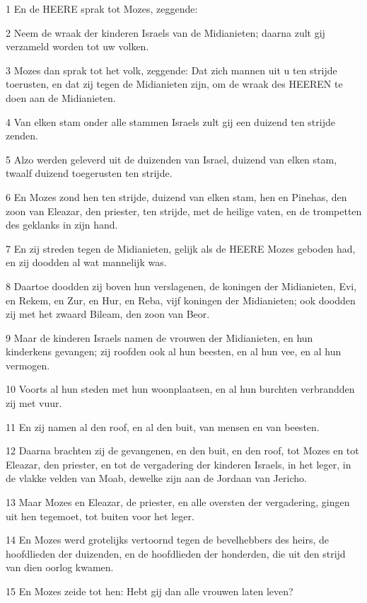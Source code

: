 \par 1 En de HEERE sprak tot Mozes, zeggende:
\par 2 Neem de wraak der kinderen Israels van de Midianieten; daarna zult gij verzameld worden tot uw volken.
\par 3 Mozes dan sprak tot het volk, zeggende: Dat zich mannen uit u ten strijde toerusten, en dat zij tegen de Midianieten zijn, om de wraak des HEEREN te doen aan de Midianieten.
\par 4 Van elken stam onder alle stammen Israels zult gij een duizend ten strijde zenden.
\par 5 Alzo werden geleverd uit de duizenden van Israel, duizend van elken stam, twaalf duizend toegerusten ten strijde.
\par 6 En Mozes zond hen ten strijde, duizend van elken stam, hen en Pinehas, den zoon van Eleazar, den priester, ten strijde, met de heilige vaten, en de trompetten des geklanks in zijn hand.
\par 7 En zij streden tegen de Midianieten, gelijk als de HEERE Mozes geboden had, en zij doodden al wat mannelijk was.
\par 8 Daartoe doodden zij boven hun verslagenen, de koningen der Midianieten, Evi, en Rekem, en Zur, en Hur, en Reba, vijf koningen der Midianieten; ook doodden zij met het zwaard Bileam, den zoon van Beor.
\par 9 Maar de kinderen Israels namen de vrouwen der Midianieten, en hun kinderkens gevangen; zij roofden ook al hun beesten, en al hun vee, en al hun vermogen.
\par 10 Voorts al hun steden met hun woonplaatsen, en al hun burchten verbrandden zij met vuur.
\par 11 En zij namen al den roof, en al den buit, van mensen en van beesten.
\par 12 Daarna brachten zij de gevangenen, en den buit, en den roof, tot Mozes en tot Eleazar, den priester, en tot de vergadering der kinderen Israels, in het leger, in de vlakke velden van Moab, dewelke zijn aan de Jordaan van Jericho.
\par 13 Maar Mozes en Eleazar, de priester, en alle oversten der vergadering, gingen uit hen tegemoet, tot buiten voor het leger.
\par 14 En Mozes werd grotelijks vertoornd tegen de bevelhebbers des heirs, de hoofdlieden der duizenden, en de hoofdlieden der honderden, die uit den strijd van dien oorlog kwamen.
\par 15 En Mozes zeide tot hen: Hebt gij dan alle vrouwen laten leven?
